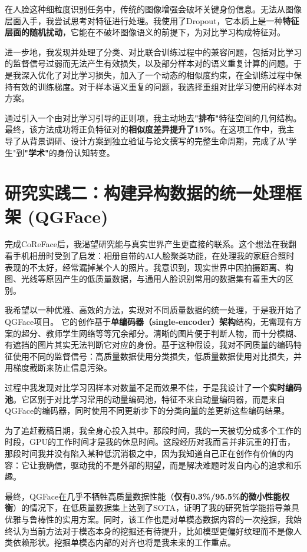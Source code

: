 \documentclass[11pt, letterpaper]{article}
\begin{document}
在人脸这种细粒度识别任务中，传统的图像增强会破坏关键身份信息。无法从图像层面入手，我尝试思考对特征进行处理。我使用了Dropout，它本质上是一种\textbf{特征层面的随机扰动}，它能在不破坏图像语义的前提下，为对比学习构成特征对。

进一步地，我发现并处理了分类、对比联合训练过程中的兼容问题，包括对比学习的监督信号过弱而无法产生有效损失，以及部分样本对的语义重复计算的问题。于是我深入优化了对比学习损失，加入了一个动态的相似度约束，在全训练过程中保持有效的训练梯度。对于样本语义重复的问题，我选择重组对比学习使用的样本对方案。

通过引入一个由对比学习引导的正则项，我主动地去\textbf{"排布"}特征空间的几何结构。最终，该方法成功将正负特征对的\textbf{相似度差异提升了15\%}。在这项工作中，我主导了从背景调研、设计方案到独立验证与论文撰写的完整生命周期，完成了从"学生"到\textbf{"学术"}的身份认知转变。

\section{研究实践二：构建异构数据的统一处理框架 (QGFace)\cite{qgface}}

完成CoReFace后，我渴望研究能与真实世界产生更直接的联系。这个想法在我翻看手机相册时受到了启发：相册自带的AI人脸聚类功能，在处理我的家庭合照时表现的不太好，经常漏掉某个人的照片。我意识到，现实世界中因拍摄距离、构图、光线等原因产生的低质量数据，与通用人脸识别常用的数据集有着重大的区别。

我希望以一种优雅、高效的方法，实现对不同质量数据的统一处理，于是我开始了QGFace项目。
它的创作基于\textbf{单编码器（single-encoder）架构}结构，无需现有方案的超分、教师学生网络等等冗余部分。清晰的图片便于判断人物，而十分模糊、有遮挡的图片其实无法判断它对应的身份。基于这种假设，我对不同质量的编码特征使用不同的监督信号：高质量数据使用分类损失，低质量数据使用对比损失，并用梯度截断来防止信息污染。

过程中我发现对比学习因样本对数量不足而效果不佳，于是我设计了一个\textbf{实时编码池}。它区别于对比学习常用的动量编码池，特征不来自动量编码器，而是来自QGFace的编码器，同时使用不同更新步下的分类向量的差更新这些编码结果。

为了追赶截稿日期，我全身心投入其中。那段时间，我的一天被切分成多个工作的时段，GPU的工作时间才是我的休息时间。这段经历对我而言并非沉重的打击，那段时间我并没有陷入某种低沉消极之中，因为我知道自己正在创作有价值的内容：它让我确信，驱动我的不是外部的期望，而是解决难题时发自内心的追求和乐趣。

最终，QGFace在几乎不牺牲高质量数据性能（\textbf{仅有0.3\%/95.5\%的微小性能权衡}）的情况下，在低质量数据集上达到了SOTA，证明了我的研究哲学能指导兼具优雅与鲁棒性的实用方案。同时，该工作也是对单模态数据内容的一次挖掘，我始终认为当前方法对于模态本身的挖掘还有待提升，比如模型更偏好纹理而不是像人类依赖形状。挖掘单模态内部的对齐也将是我未来的工作重点。
\end{document}
